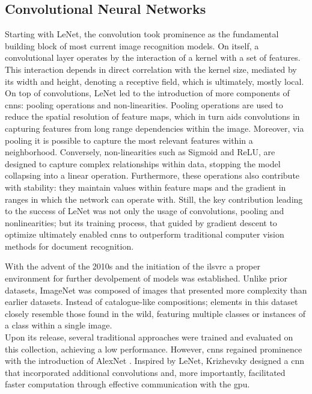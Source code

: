 \subsection{Convolutional Neural Networks}
\label{rel:sub_cnn}
Starting with LeNet, the convolution took prominence as the fundamental building block 
of most current image recognition models. On itself, a convolutional layer operates by the 
interaction of a kernel with a set of features. This interaction depends in 
direct correlation with the kernel size, mediated by its width and height, denoting a receptive field,
which is ultimately, mostly local. \\

\noindent On top of convolutions, LeNet led to the introduction of more components of \glspl{cnn}: 
pooling operations and non-linearities. Pooling operations are used to reduce the spatial 
resolution of feature maps, which in turn aids convolutions in capturing features from long 
range dependencies within the image. Moreover, via pooling it is possible to capture the most 
relevant features within a neighborhood.
Conversely, non-linearities such as Sigmoid and ReLU, are designed to capture complex 
relationships within data, stopping the model collapsing into a linear operation. Furthermore, these 
operations also contribute with stability: they maintain values within feature maps and the gradient 
in ranges in which the network can operate with. %
Still, the key contribution leading to the success of LeNet was not only the usage of 
convolutions, pooling and nonlinearities; but its training process, that guided by gradient descent 
to optimize ultimately enabled \glspl{cnn} to outperform traditional computer vision methods for 
document recognition. 



\noindent With the advent of the 2010s and the initiation of the \gls{ilsvrc} \autocite{ILSVRC15} 
a proper environment for further devolpement of models was established. Unlike prior datasets, 
ImageNet was composed of images that presented more complexity than earlier datasets. Instead 
of catalogue-like compositions; elements in this dataset closely resemble those found 
in the wild, featuring multiple classes or instances of a class within a single image.\\
Upon its release, several traditional approaches were trained and evaluated on this collection, 
achieving a low performance. However, \glspl{cnn} regained prominence with the introduction of
AlexNet \autocite{krizhevsky2012imagenet}. Inspired by LeNet, Krizhevsky designed a 
\gls{cnn} that incorporated additional convolutions and, more importantly, facilitated faster 
computation through effective communication with the \gls{gpu}.

